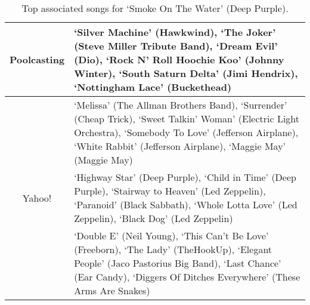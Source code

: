 \begin{table}[bthp]\centering
\setlength{\extrarowheight}{3pt}
\setlength{\abovecaptionskip}{3pt}
\setlength{\belowcaptionskip}{3pt}
\caption{Top associated songs for `Smoke On The Water' (Deep Purple).}\label{table:samplerelevance3}
{\fontsize{8}{10}\selectfont\begin{tabular}{|c|p{}|}
 \hline
 \multirow{3}{*}{Poolcasting} &
 `Silver Machine' (Hawkwind), `The Joker' (Steve Miller Tribute Band), `Dream Evil' (Dio), `Rock N' Roll Hoochie Koo' (Johnny Winter), `South Saturn Delta' (Jimi Hendrix), `Nottingham Lace' (Buckethead) \vspace{2pt} \\ 
 \hline
 \multirow{3}{*}{Yahoo!} &
 `Melissa'	(The Allman Brothers Band), `Surrender'	(Cheap Trick), `Sweet Talkin' Woman' (Electric Light Orchestra), `Somebody To Love'	(Jefferson Airplane), `White Rabbit'	(Jefferson Airplane), `Maggie May' (Maggie May) \vspace{2pt} \\
 \hline
 \multirow{3}{*}{Last.fm} &
 `Highway Star'	(Deep Purple), `Child in Time'	(Deep Purple), `Stairway to Heaven' (Led Zeppelin), `Paranoid'	(Black Sabbath), `Whole Lotta Love'	(Led Zeppelin), `Black Dog' (Led Zeppelin) \vspace{2pt} \\
 \hline
 \multirow{3}{*}{Audiobaba} &
 `Double E'	(Neil Young), `This Can't Be Love'	(Freeborn), `The Lady' (TheHookUp), `Elegant People'	(Jaco Pastorius Big Band), `Last Chance'	(Ear Candy), `Diggers Of Ditches Everywhere' (These Arms Are Snakes) \vspace{2pt} \\
 \hline
\end{tabular}}
\end{table}
